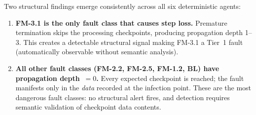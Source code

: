\documentclass[conference]{IEEEtran}
\begin{document}
\begin{table}[!t]
\centering
\caption{Structural LKW Signature Per MAST Fault Class (invariant across all
  6~deterministic agents).}
\label{tab:stability-pattern}
\setlength{\tabcolsep}{4pt}
\end{table}

Two structural findings emerge consistently across all six deterministic agents:

\begin{enumerate}
  \item \textbf{FM-3.1 is the only fault class that causes step loss.}
        Premature termination skips the processing checkpoints, producing
        propagation depth 1--3. This creates a detectable structural signal
        making FM-3.1 a Tier~1 fault (automatically observable without semantic
        analysis).

  \item \textbf{All other fault classes (FM-2.2, FM-2.5, FM-1.2, BL) have
        propagation depth~$= 0$.} Every expected checkpoint is reached; the
        fault manifests only in the \emph{data} recorded at the infection point.
        These are the most dangerous fault classes: no structural alert fires,
        and detection requires semantic validation of checkpoint data contents.
\end{enumerate}
\end{document}
